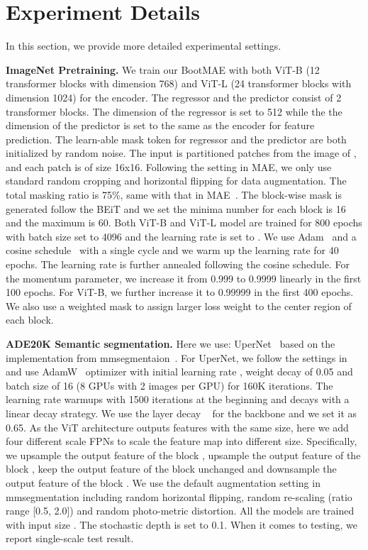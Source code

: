 \documentclass[runningheads]{llncs}
\begin{document}
\section{Experiment Details}
In this section, we provide more detailed experimental settings.

\noindent \textbf{ImageNet Pretraining.}
We train our BootMAE with both ViT-B (12 transformer blocks with dimension 768) and ViT-L (24 transformer blocks with dimension 1024) for the encoder. 
The regressor and the predictor consist of 2 transformer blocks. The dimension of the regressor is set to 512 while the the dimension of the predictor is set to the same as the encoder for feature prediction. The learn-able mask token for regressor and the predictor are both initialized by random noise. 
The input is partitioned  patches from the image of , and each patch is of size 16x16. Following the setting in MAE, we only use standard random cropping and horizontal flipping for data augmentation.
The total masking ratio is 75\%, same with that in MAE~\cite{he2021masked}. The block-wise mask is generated follow the BEiT and we set the minima number for each block is 16 and the maximum is 60. 
Both ViT-B and ViT-L model are trained for 800 epochs with batch size set to 4096 and the learning rate is set to .
We use Adam~\cite{kingma2014adam} and a cosine schedule~\cite{loshchilov2016sgdr} with a single cycle and we warm up the learning rate for 40 epochs. The learning rate is further annealed following the cosine schedule. 
For the momentum parameter, we increase it from 0.999 to 0.9999 linearly in the first 100 epochs. For ViT-B, we further increase it to 0.99999 in the first 400 epochs.
We also use a weighted mask to assign larger loss weight to the center region of each block. 

\noindent \textbf{ADE20K Semantic segmentation.}
Here we use: UperNet~\cite{xiao2018unified} based on the implementation from mmsegmentaion~\cite{mmseg2020}. 
For UperNet, we follow the settings in ~\cite{bao2021beit} and use AdamW~\cite{loshchilov2017decoupled} optimizer with initial learning rate , weight decay of 0.05 and batch size of 16 (8 GPUs with 2 images per GPU) for 160K iterations. The learning rate warmups with 1500 iterations at the beginning and decays with a linear decay strategy. We use the layer decay ~\cite{bao2021beit} for the backbone and we set it as 0.65. 
As the ViT architecture outputs features with the same size, here we add four different scale FPNs to scale the feature map into different size. Specifically, we upsample the output feature of the  block , upsample the output feature of the  block , keep the output feature of the  block unchanged and downsample the output feature of the  block . 
We use the default augmentation setting in mmsegmentation including random horizontal flipping, random re-scaling (ratio range [0.5, 2.0]) and random photo-metric distortion. All the models are trained with input size . The stochastic depth is set to 0.1. When it comes to testing, we report single-scale test result.
\end{document}
